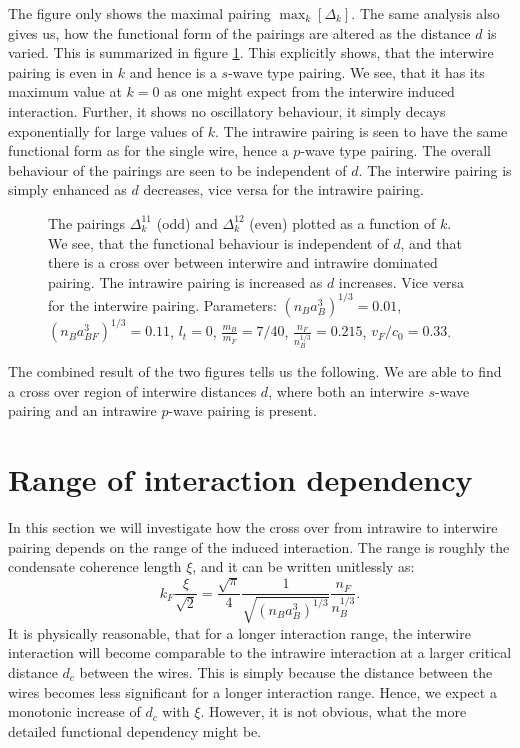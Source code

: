 The figure only shows the maximal pairing $\max_k[\Delta_k]$. The same analysis also gives us, how the functional form of the pairings are altered as the distance $d$ is varied. This is summarized in figure \ref{fig.pairingkdependT0dvaried}. This explicitly shows, that the interwire pairing is even in $k$ and hence is a $s$-wave type pairing. We see, that it has its maximum value at $k=0$ as one might expect from the interwire induced interaction. Further, it shows no oscillatory behaviour, it simply decays exponentially for large values of $k$. The intrawire pairing is seen to have the same functional form as for the single wire, hence a $p$-wave type pairing. The overall behaviour of the pairings are seen to be independent of $d$. The interwire pairing is simply enhanced as $d$ decreases, vice versa for the intrawire pairing.  

\begin{figure} 
\begin{center}  
  
\caption{The pairings $\Delta^{11}_k$ (odd) and $\Delta^{12}_k$ (even) plotted as a function of $k$. We see, that the functional behaviour is independent of $d$, and that there is a cross over between interwire and intrawire dominated pairing. The intrawire pairing is increased as $d$ increases. Vice versa for the interwire pairing. Parameters: $(n_Ba_B^3)^{1/3} = 0.01$, $(n_Ba_{BF}^3)^{1/3} = 0.11$, $l_t = 0$, $\frac{m_B}{m_F} = 7/40$, $\frac{n_F}{n_B^{1/3}} = 0.215$, $v_F/c_0 = 0.33$. }  
\label{fig.pairingkdependT0dvaried}  
\end{center}    
\end{figure}

The combined result of the two figures tells us the following. We are able to find a cross over region of interwire distances $d$, where both an interwire $s$-wave pairing and an intrawire $p$-wave pairing is present.

\section{Range of interaction dependency}
In this section we will investigate how the cross over from intrawire to interwire pairing depends on the range of the induced interaction. The range is roughly the condensate coherence length $\xi$, and it can be written unitlessly as:
\begin{equation}
k_F\frac{\xi}{\sqrt{2}} = \frac{\sqrt{\pi}}{4}\frac{1}{\sqrt{(n_Ba_B^3)^{1/3}}}\frac{n_F}{n_B^{1/3}}.
\end{equation}
It is physically reasonable, that for a longer interaction range, the interwire interaction will become comparable to the intrawire interaction at a larger critical distance $d_c$ between the wires. This is simply because the distance between the wires becomes less significant for a longer interaction range. Hence, we expect a monotonic increase of $d_c$ with $\xi$. However, it is not obvious, what the more detailed functional dependency might be.  


